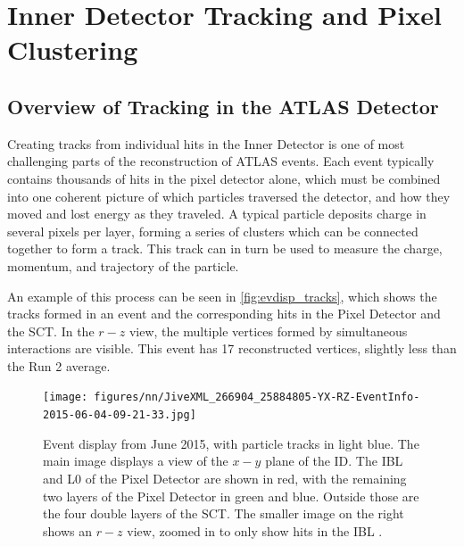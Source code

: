 
\chapter{Inner Detector Tracking and Pixel Clustering} %

\label{sec:NN} %



\section{Overview of Tracking in the ATLAS Detector}
\label{sec:tracking}

Creating tracks from individual hits in the Inner Detector is one of most challenging parts of the reconstruction of \ac{ATLAS} events. Each event typically contains thousands of hits in the pixel detector alone, which must be combined into one coherent picture of which particles traversed the detector, and how they moved and lost energy as they traveled. A typical particle deposits charge in several pixels per layer, forming a series of clusters which can be connected together to form a track. This track can in turn be used to measure the charge, momentum, and trajectory of the particle. 

An example of this process can be seen in \autoref{fig:evdisp_tracks}, which shows the tracks formed in an event and the corresponding hits in the Pixel Detector and the \ac{SCT}. In the $r-z$ view, the multiple vertices formed by simultaneous interactions are visible. This event has 17 reconstructed vertices, slightly less than the Run 2 average. 

\begin{centering}
\begin{figure}[bth]
\myfloatalign
\texttt{[image: figures/nn/JiveXML\_266904\_25884805-YX-RZ-EventInfo-2015-06-04-09-21-33.jpg]}
\caption{ Event display from June 2015, with particle tracks in light blue. The main image displays a view of the $x-y$ plane of the \ac{ID}. The \ac{IBL} and L0 of the Pixel Detector are shown in red, with the remaining two layers of the Pixel Detector in green and blue. Outside those are the four double layers of the \ac{SCT}. The smaller image on the right shows an $r-z$ view, zoomed in to only show hits in the \ac{IBL} \cite{Collaboration:2022202}.}
\label{fig:evdisp_tracks}
\end{figure}
\end{centering}

